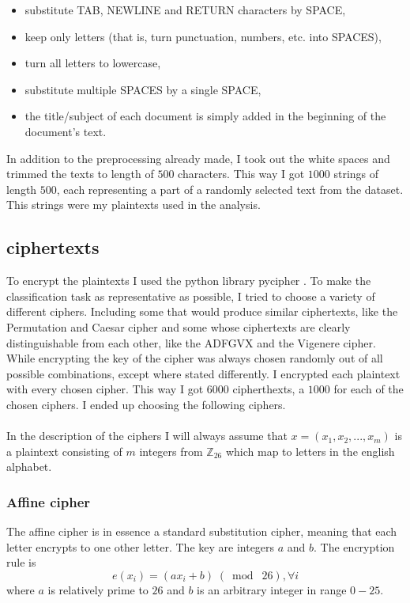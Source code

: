 \documentclass[a4paper]{article}
\begin{document}
\begin{itemize}	
	\setlength\itemsep{-0.2em}
    \item substitute TAB, NEWLINE and RETURN characters by SPACE,
    \item keep only letters (that is, turn punctuation, numbers, etc. into SPACES),
    \item turn all letters to lowercase,
    \item substitute multiple SPACES by a single SPACE,
    \item the title/subject of each document is simply added in the beginning of the document's text.
\end{itemize}


In addition to the preprocessing already made, I took out the white spaces and trimmed the texts to length of $500$ characters. This way I got $1000$ strings of length $500$, each representing a part of a randomly selected text from the dataset. This strings were my plaintexts used in the analysis.

\subsection*{ciphertexts}
To encrypt the plaintexts I used the python library pycipher \cite{pycipher}. To make the classification task as representative as possible, I tried to choose a variety of different ciphers. Including some that would produce similar ciphertexts, like the Permutation and Caesar cipher and some whose ciphertexts are clearly distinguishable from each other, like the ADFGVX and the Vigenere cipher. While encrypting the key of the cipher was always chosen randomly out of all possible combinations, except where stated differently. I encrypted each plaintext with every chosen cipher. This way I got $6000$ cipherthexts, a $1000$ for each of the chosen ciphers. I ended up choosing the following ciphers.\\
\\
In the description of the ciphers I will always assume that $x = (x_{1}, x_{2}, ...,x_{m})$ is a plaintext consisting of $m$ integers from $\mathbb{Z}_{26}$ which map to letters in the english alphabet.

\subsubsection*{Affine cipher}
The affine cipher is in essence a standard substitution cipher, meaning that each letter encrypts to one other letter. The key are integers $a$ and $b$. The encryption rule is
$$e(x_{i}) = (ax_{i} + b) \;(\bmod\; 26), \forall i$$
where $a$ is relatively prime to $26$ and $b$ is an arbitrary integer in range $0-25$.
\end{document}
